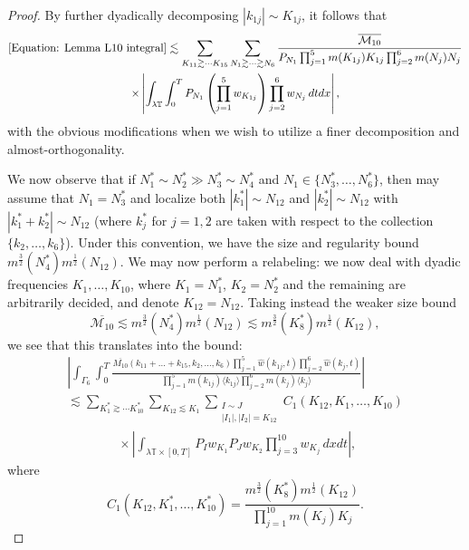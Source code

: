 \documentclass[12pt, letterpaper]{amsart}
\begin{document}
\begin{proof}
    By further dyadically decomposing $|k_{1j}|\sim K_{1j}$, it follows that
    \begin{multline*}
        \eqref{Equation: Lemma L10 integral}\lesssim \sum_{K_{11}\gtrsim \cdots K_{15}}\sum_{N_1\gtrsim \cdots \gtrsim N_6}\frac{\overline{\mathcal{M}_{10}}}{P_{N_1}\prod_{j=1}^5m(K_{1j})K_{1j}\prod_{j=2}^6m(N_j)N_j}\\
        \times\left|\int_{\lambda\mathbb{T}}\int_0^T P_{N_1}\left(\prod_{j=1}^5 w_{K_{1j}}\right)\prod_{j=2}^6w_{N_j}\,dtdx\right|,
    \end{multline*}
    with the obvious modifications when we wish to utilize a finer decomposition and almost-orthogonality.
    
    We now observe that if  $N_1^*\sim N_2^*\gg N_3^*\sim N_4^*$ and $N_1 \in \{N_3^*, \dots, N_6^*\}$, then may assume that $N_1 = N_3^*$ and localize both $|k_1^*|\sim N_{12}$ and $|k_2^*|\sim N_{12}$ with $|k_1^*+k_2^*|\sim N_{12}$ (where $k_j^*$ for $j = 1,2$ are taken with respect to the collection $\{k_2,\dots, k_6\}$). Under this convention, we have the size and regularity bound $m^{\frac32}(N_4^*)m^{\frac12}(N_{12})$. We may now perform a relabeling: we now deal with dyadic frequencies $K_1,\dots, K_{10}$, where $K_1 = N_1^*$, $K_2 = N_2^*$ and the remaining are arbitrarily decided, and denote $K_{12} = N_{12}$. Taking instead the weaker size bound 
    \[
    \overline{\mathcal{M}_{10}}\lesssim m^\frac32(N_4^*)m^\frac12(N_{12})\lesssim m^\frac32(K_8^*)m^\frac12(K_{12}),
    \]
    we see that this translates into the bound:
    \begin{multline}\label{Equation: Worse Case}
\left|\int_{\Gamma_6}\int_0^T\frac{\overline{M_{10}}(k_{11}+\dots+k_{15},k_2,\dots,k_6)\prod_{j=1}^5\widehat{w}(k_{1j},t)\prod_{j=2}^6\widehat{w}(k_j,t)}{\prod_{j=1}^5m(k_{1j})\langle k_{1j}\rangle\prod_{j=2}^6m(k_j)\langle k_j\rangle}\right|\\
\lesssim 
\sum_{K_1^*\gtrsim \cdots K_{10}^*}\sum_{K_{12}\lesssim K_1}\sum_{\substack{I\sim J\\ |I_1|,|I_2|=K_{12}}}C_1(K_{12},K_1,\dots, K_{10})\\
\qquad\qquad\times\left|\int_{\lambda\mathbb{T}\times [0,T]}P_{I}w_{K_1}P_{J}w_{K_2}\prod_{j=3}^{10}w_{K_j}\,dxdt\right|,
    \end{multline}
    where
    \[
C_1(K_{12},K_1^*,\dots, K_{10}^*) = \frac{m^{\frac32}(K_{8}^*)m^{\frac12}(K_{12})}{\prod_{j=1}^{10}m(K_j)K_j}.
    \]
    

\end{proof}
\end{document}
